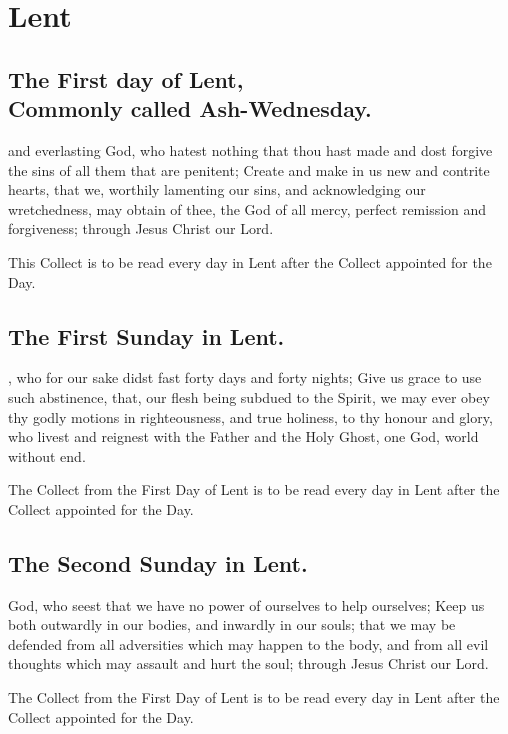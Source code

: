\section{Lent}

\subsection{The First day of Lent,\\
Commonly called Ash-Wednesday.}
 and everlasting God, who hatest nothing that thou hast made and dost forgive the sins of all them that are penitent; Create and make in us new and contrite hearts, that we, worthily lamenting our sins, and acknowledging our wretchedness, may obtain of thee, the God of all mercy, perfect remission and forgiveness; through Jesus Christ our Lord.
\begin{secrubric}
This Collect is to be read every day in Lent after the Collect appointed for the Day.
\end{secrubric}

\subsection{The First Sunday in Lent.}
, who for our sake didst fast forty days and forty nights; Give us grace to use such abstinence, that, our flesh being subdued to the Spirit, we may ever obey thy godly motions in righteousness, and true holiness, to thy honour and glory, who livest and reignest with the Father and the Holy Ghost, one God, world without end.
\begin{secrubric}
The Collect from the First Day of Lent is to be read every day in Lent after the Collect appointed for the Day.
\end{secrubric}

\subsection{The Second Sunday in Lent.}
 God, who seest that we have no power of ourselves to help ourselves; Keep us both outwardly in our bodies, and inwardly in our souls; that we may be defended from all adversities which may happen to the body, and from all evil thoughts which may assault and hurt the soul; through Jesus Christ our Lord.
\begin{secrubric}
The Collect from the First Day of Lent is to be read every day in Lent after the Collect appointed for the Day.
\end{secrubric}

